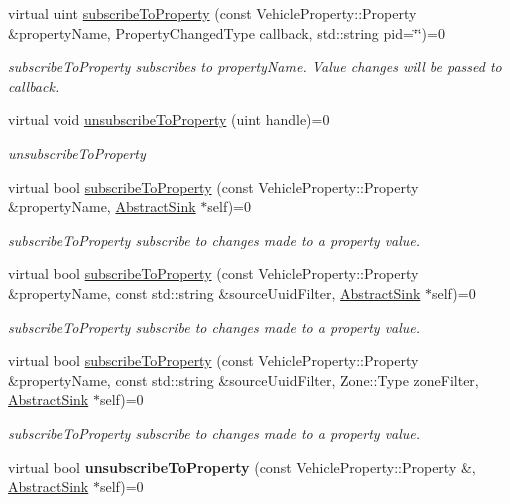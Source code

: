 \begin{DoxyCompactItemize}
\item 
virtual uint \hyperlink{classAbstractRoutingEngine_a7a30b4c21f91ce6586e1575458238809}{subscribe\+To\+Property} (const Vehicle\+Property\+::\+Property \&property\+Name, Property\+Changed\+Type callback, std\+::string pid=\char`\"{}\char`\"{})=0
\begin{DoxyCompactList}\small\item\em subscribe\+To\+Property subscribes to property\+Name. Value changes will be passed to callback. \end{DoxyCompactList}\item 
virtual void \hyperlink{classAbstractRoutingEngine_aa56c145aa682ece99791831bc7c420f7}{unsubscribe\+To\+Property} (uint handle)=0
\begin{DoxyCompactList}\small\item\em unsubscribe\+To\+Property \end{DoxyCompactList}\item 
virtual bool \hyperlink{classAbstractRoutingEngine_a1714228e3ef96be7f5a50811b516c352}{subscribe\+To\+Property} (const Vehicle\+Property\+::\+Property \&property\+Name, \hyperlink{classAbstractSink}{Abstract\+Sink} $\ast$self)=0
\begin{DoxyCompactList}\small\item\em subscribe\+To\+Property subscribe to changes made to a property value. \end{DoxyCompactList}\item 
virtual bool \hyperlink{classAbstractRoutingEngine_aae6c5d27dc01b4773b6bf77331f86e9f}{subscribe\+To\+Property} (const Vehicle\+Property\+::\+Property \&property\+Name, const std\+::string \&source\+Uuid\+Filter, \hyperlink{classAbstractSink}{Abstract\+Sink} $\ast$self)=0
\begin{DoxyCompactList}\small\item\em subscribe\+To\+Property subscribe to changes made to a property value. \end{DoxyCompactList}\item 
virtual bool \hyperlink{classAbstractRoutingEngine_ac64ad6ac6a1fcd6ce7ad190262176466}{subscribe\+To\+Property} (const Vehicle\+Property\+::\+Property \&property\+Name, const std\+::string \&source\+Uuid\+Filter, Zone\+::\+Type zone\+Filter, \hyperlink{classAbstractSink}{Abstract\+Sink} $\ast$self)=0
\begin{DoxyCompactList}\small\item\em subscribe\+To\+Property subscribe to changes made to a property value. \end{DoxyCompactList}\item 
\hypertarget{classAbstractRoutingEngine_a23c16d50214f36e08383cfec64e1f569}{virtual bool {\bfseries unsubscribe\+To\+Property} (const Vehicle\+Property\+::\+Property \&, \hyperlink{classAbstractSink}{Abstract\+Sink} $\ast$self)=0}\label{classAbstractRoutingEngine_a23c16d50214f36e08383cfec64e1f569}


\end{DoxyCompactItemize}
